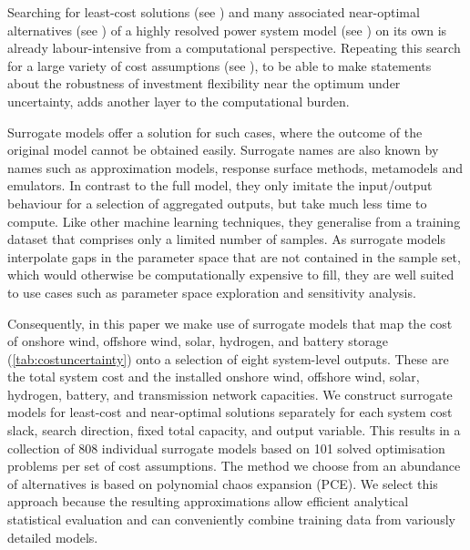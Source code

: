 

Searching for least-cost solutions (see ) and many
associated near-optimal alternatives (see ) of a highly
resolved power system model (see ) on its own is already
labour-intensive from a computational perspective. Repeating this search for a
large variety of cost assumptions (see ), to be able to
make statements about the robustness of investment flexibility near the optimum
under uncertainty, adds another layer to the computational burden.


Surrogate models offer a solution for such cases, where the outcome of the
original model cannot be obtained easily. Surrogate names are also known by
names such as approximation models, response surface methods, metamodels and
emulators. In contrast to the full model, they only imitate the input/output
behaviour for a selection of aggregated outputs, but take much less time to
compute.\cite{palar_multi-fidelity_2016} Like other machine learning techniques,
they generalise from a training dataset that comprises only a limited number of
samples. As surrogate models interpolate gaps in the parameter space that are
not contained in the sample set, which would otherwise be computationally
expensive to fill, they are well suited to use cases such as parameter space
exploration and sensitivity analysis.


Consequently, in this paper we make use of surrogate models that map the cost of
onshore wind, offshore wind, solar, hydrogen, and battery storage
(\cref{tab:costuncertainty}) onto a selection of eight system-level outputs.
These are the total system cost and the installed onshore wind, offshore wind,
solar, hydrogen, battery, and transmission network capacities. We construct
surrogate models for least-cost and near-optimal solutions separately for each
system cost slack, search direction, fixed total capacity, and output variable.
This results in a collection of 808 individual surrogate models based on 101
solved optimisation problems per set of cost assumptions. The method we choose
from an abundance of alternatives is based on polynomial chaos expansion (PCE).
\cite{sudret_global_2008,fajraoui_optimal_2017,gratiet_metamodel-based_2015} We
select this approach because the resulting approximations allow efficient
analytical statistical evaluation\cite{sudret_global_2008} and can conveniently
combine training data from variously detailed
models.\cite{palar_multi-fidelity_2016}

